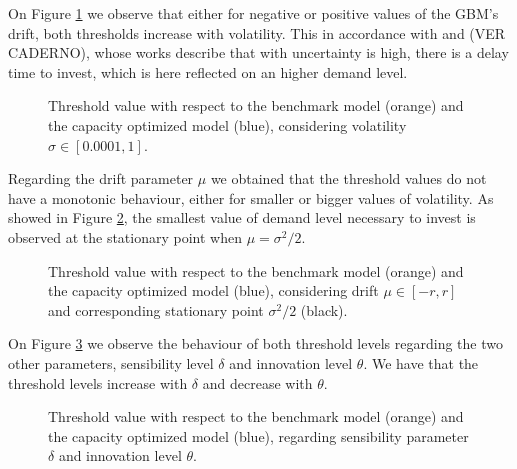 On Figure \ref{fig:sigm} we observe that either for negative or positive values of the GBM's drift, both thresholds increase with volatility. This in accordance with \cite{rita} and \cite{hagspiel:cap} (VER CADERNO), whose works describe that with uncertainty is high, there is a delay time to invest, which is here reflected on an higher demand level.

\begin{figure}[!htb]
	\begin{subfigmatrix}{2}
			\end{subfigmatrix}
			\caption{Threshold value with respect to the benchmark model (orange) and the capacity optimized model (blue), considering volatility $\sigma \in [0.0001, 1]$.}
			\label{fig:sigm}
\end{figure}

Regarding the drift parameter $\mu$ we obtained that the threshold values do not have a monotonic behaviour, either for smaller or bigger values of volatility. As showed in Figure \ref{fig:mu}, the smallest value of demand level necessary to invest is observed at the stationary point when $\mu=\sigma^2/2$.

\begin{figure}[!htb]
	\begin{subfigmatrix}{2}
	\end{subfigmatrix}
	\caption{Threshold value with respect to the benchmark model (orange) and the capacity optimized model (blue), considering drift $\mu \in [-r, r]$ and corresponding stationary point $\sigma^2/2$ (black).}
	\label{fig:mu}
\end{figure}

On Figure \ref{fig:td} we observe the behaviour of both threshold levels regarding the two other parameters, sensibility level $\delta$ and innovation level $\theta$. We have that the threshold levels increase with $\delta$ and decrease with $\theta$.

\begin{figure}[!htb]
	\begin{subfigmatrix}{2}
	\end{subfigmatrix}
\caption{Threshold value with respect to the benchmark model (orange) and the capacity optimized model (blue), regarding sensibility parameter $\delta$ and innovation level $\theta$.}
\label{fig:td}
\end{figure}



